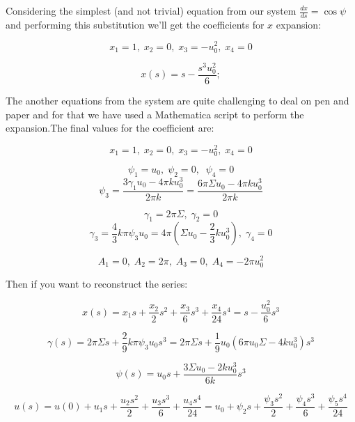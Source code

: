 \documentclass[12pt]{article}
\begin{document}




Considering the simplest (and not trivial) equation from our system $\frac{dx}{ds} =  \cos \psi$ and performing this substitution we'll get the coefficients for $x$ expansion:

$$
x_1 = 1 ,\; x_2 = 0 ,\; x_3 = - u_0^2 ,\; x_4 = 0
$$

$$
x(s)=s-\frac{s^3 u_0^2}{6};
$$

The another equations from the system are quite challenging to deal on pen and paper and for that we have used a Mathematica script to perform the expansion.The final values for the coefficient are:

$$
x_1 = 1 ,\; x_2 = 0 ,\; x_3 = - u_0^2 ,\; x_4 = 0
$$


$$
\psi_1 = u_0  ,\; \psi_2 = 0 ,\; \; \psi_4 = 0
$$
$$
\psi_3 = \frac{3\gamma_1 u_0 - 4 \pi k u_0^3}{2 \pi k } = \frac{6 \pi \Sigma u_0 - 4 \pi k u_0^3}{2 \pi k }
$$


$$
\gamma_1 = 2 \pi \Sigma ,\; \gamma_2 = 0 
$$
$$
\gamma_3 = \frac{4}{3} k \pi \psi_3 u_0 = 4 \pi (\Sigma u_0 - \frac{2}{3} k u_0^3) ,\; \gamma_4 = 0
$$


$$
A_1 = 0 ,\; A_2 =  2 \pi ,\; A_3 = 0 ,\; A_4 = - 2 \pi u_0^2
$$



Then if you want to reconstruct the series:


$$
x(s)=x_1 s+\frac{x_2}{2}s^2+\frac{x_3}{6}s^3+\frac{x_4}{24} s^4 =s-\frac{u_0^2}{6}s^3 
$$





$$
\gamma(s) = 2 \pi \Sigma s + \frac{2}{9} k \pi \psi_3 u_0 s^3 = 2 \pi \Sigma s + \frac{1}{9}  u_0 (6 \pi u_0 \Sigma - 4 k u_0^3)s^3
$$

$$
\psi(s)=u_0s + \frac{3  \Sigma u_0 - 2  k u_0^3}{6 k }s^3
$$

$$
u(s)=u(0) + u_1s + \frac{u_2 s^2}{2} + \frac{u_3 s^3}{6} + \frac{u_4 s^4}{24} = u_0 + \psi_2 s + \frac{\psi_3 s^2}{2} + \frac{\psi_4 s^3}{6} + \frac{\psi_5 s^4}{24}
$$
\end{document}
